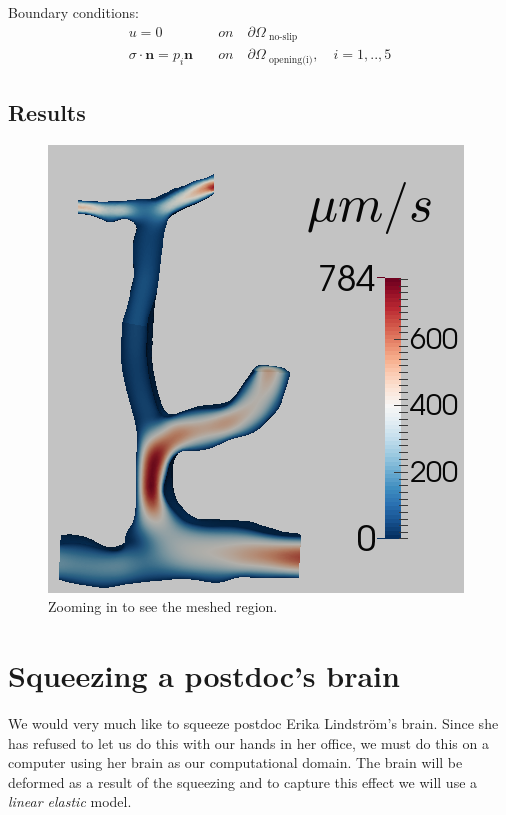 \documentclass[epsfig,11pt]{article}
\begin{document}
Boundary conditions:
\begin{align*}
u = 0 \quad &on \quad \partial \Omega_{\text{ no-slip}} \\
\sigma \cdot \mathbf{n} = p_i\mathbf{n} \quad &on \quad \partial \Omega_\text{ opening(i)},\quad i=1,..,5
\end{align*}

\subsection{Results}


\begin{figure}[h!] 
\begin{center}
  \includegraphics[scale=0.4]{result.png}
  \end{center}
  \caption{Zooming in to see the meshed region.}
\end{figure}


\section{Squeezing a postdoc's brain}

We would very much like to squeeze postdoc Erika Lindström's brain. Since she has refused to let us do this with our hands in her office, we must do this on a computer using her brain as our computational domain. The brain will be deformed as a result of the squeezing and to capture this effect we will use a \emph{linear elastic} model. 
\end{document}
